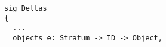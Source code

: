 \lstset{frame=tb, aboveskip=12pt, belowskip=-3pt, breaklines=true, basicstyle=\small\ttfamily, tabsize=2, mathescape=true}
\begin{lstlisting}[caption={deltas.als, lines 5-19}, label=alloy:savcbs-delta-constituents-V, captionpos=b]
sig Deltas
{
  ...
  objects_e: Stratum -> ID -> Object,
\end{lstlisting}